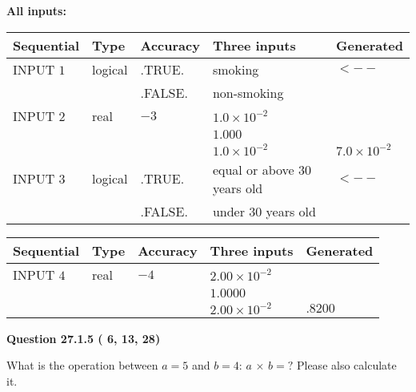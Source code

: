 \documentclass[12pt]{article}
\begin{document}
   
   
   
\noindent\vspace{0.1in}\hspace{-0.08in} {\textbf{\Large{All inputs: }}}
   
   
  
  
\noindent\begin{tabular}{|l|l|l|l|l|}
\hline
 Sequential & Type & Accuracy & Three inputs & Generated \\ 
\hline
 
 
  INPUT $           1$ & logical & .TRUE. & 
 smoking & 
  $ <-- $ 
  \\
  & & .FALSE. & 
  non-smoking & 
 \\  \hline  
 
 
  INPUT $           2$ & real & $          -3 $ & $
 1.0 \times 10^{-2}
  $ & \\
  & & &  $
 1.000
  $ & \\
  & & &  $
 1.0 \times 10^{-2}
 $ & $ 7.0 \times 10^{-2} $ 
 \\  \hline  
 
 
  INPUT $           3$ & logical & .TRUE. & 
 equal or above 30 years old & 
  $ <-- $ 
  \\
  & & .FALSE. & 
  under 30 years old & 
 \\  \hline  
 \end{tabular}
   
   
  
  
\noindent\begin{tabular}{|l|l|l|l|l|}
\hline
 Sequential & Type & Accuracy & Three inputs & Generated \\ 
\hline
 
 
  INPUT $           4$ & real & $          -4 $ & $
 2.00 \times 10^{-2}
  $ & \\
  & & &  $
 1.0000
  $ & \\
  & & &  $
 2.00 \times 10^{-2}
 $ & $ .8200 $ 
 \\  \hline  
 \end{tabular}
   
   
  
\vspace{0.2in}
  
{\textbf{\Large{Question
27.1.5 
 (          6,         13,         28)
}}}
  
  
What is the operation between $a= %
5$ and $b= %
4$:
$a$  %
$\times$ $b=?$ Please also calculate it.
 
 
\noindent{}
 
\end{document}
